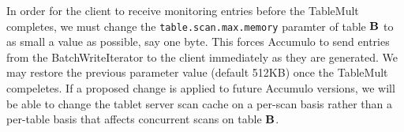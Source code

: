In order for the client to receive monitoring entries before the TableMult completes,
we must change the \texttt{table.scan.max.memory} paramter of table $\mathbf{B}$ to as small a value as possible, say one byte. 
This forces Accumulo to send entries from the BatchWriteIterator to the client immediately as they are generated.
We may restore the previous parameter value (default 512KB) once the TableMult compeletes.
If a proposed change \cite{ACCUMULO-261} is applied to future Accumulo versions,
we will be able to change the tablet server scan cache on a per-scan basis rather than a per-table basis
that affects concurrent scans on table $\mathbf{B}$.



